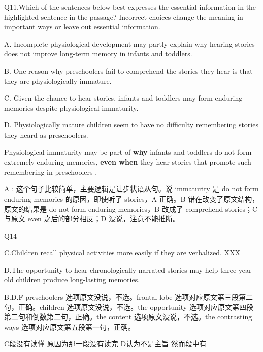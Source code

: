 \begin{blk}
    \begin{qst}
        Q11.Which of the sentences below best expresses the essential information in the highlighted sentence in the passage? Incorrect choices change the meaning in important ways or leave out essential information.
    \end{qst}

    \begin{chc}
        A. Incomplete physiological development may partly explain why hearing stories does not improve long-term memory in infants and toddlers.

        B. One reason why preschoolers fail to comprehend the stories they hear is that they are physiologically immature.

        C. Given the chance to hear stories, infants and toddlers may form enduring memories despite physiological immaturity.

        D. Physiologically mature children seem to have no difficulty remembering stories they heard as preschoolers.
    \end{chc}

    \begin{psgq}
        Physiological immaturity may be part of \textbf{why} infants and toddlers do not form extremely enduring memories, \textbf{even when} they hear stories that promote such remembering in preschoolers .
    \end{psgq}

    \begin{nlz}
        A : 这个句子比较简单，主要逻辑是让步状语从句。说 immaturity 是 do not form enduring memories 的原因，即使听了 stories，A 正确。B 错在改变了原文结构，原文的结果是 do not form enduring memories，B 改成了 comprehend stories；C 与原文 even 之后的部分相反；D 没说，注意不能推断。
    \end{nlz}
\end{blk}

\begin{blk}
    \begin{qst}
        Q14
    \end{qst}

    \begin{chc}
        C.Children recall physical activities more easily if they are verbalized. XXX

        D.The opportunity to hear chronologically narrated stories may help three-year-old children produce long-lasting memories.
    \end{chc}

    \begin{nlz}
        B.D.F preschoolers 选项原文没说，不选。frontal lobe 选项对应原文第三段第二句，正确。children 选项原文没说，不选。the opportunity 选项对应原文第四段第二句和倒数第二句，正确。the content 选项原文没说，不选。the contrasting ways 选项对应原文第五段第一句，正确。

        C段没有读懂 原因为那一段没有读完 D认为不是主旨 然而段中有
    \end{nlz}
\end{blk}
